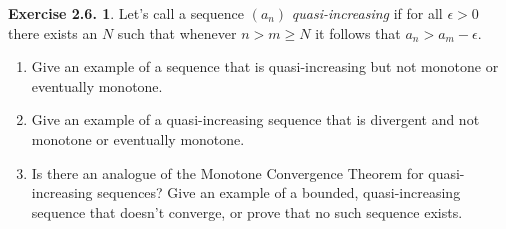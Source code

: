 \documentclass[12pt]{article}
\theoremstyle{definition}
\theoremstyle{exercise}
\newtheorem{exercise}{Exercise 2.6.}
\theoremstyle{solution}
\begin{document}
\begin{exercise}
\label{ex:6}
    Let's call a sequence \( (a_n) \) \textit{quasi-increasing} if for all \( \epsilon > 0 \) there exists an \( N \) such that whenever \( n > m \geq N \) it follows that \( a_n > a_m - \epsilon \).
    \begin{enumerate}
        \item Give an example of a sequence that is quasi-increasing but not monotone or eventually monotone.

        \item Give an example of a quasi-increasing sequence that is divergent and not monotone or eventually monotone.

        \item Is there an analogue of the Monotone Convergence Theorem for quasi-increasing sequences? Give an example of a bounded, quasi-increasing sequence that doesn't converge, or prove that no such sequence exists.
    \end{enumerate}
\end{exercise}
\end{document}
